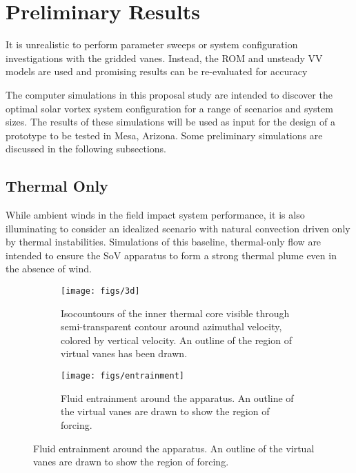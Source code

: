  
\section{Preliminary Results}
\label{sec:results}

%
%
%
%

It is unrealistic to perform parameter sweeps or system configuration investigations
with the gridded vanes. Instead, the ROM and unsteady VV models are used and promising results can be re-evaluated for 
accuracy 


The computer simulations in this proposal study 
are intended to discover the
optimal solar vortex system configuration for a range of scenarios and system
sizes. The results of these simulations will be used as input for the
design of a prototype to be tested in Mesa, Arizona. Some preliminary simulations 
are discussed in the following subsections.


\subsection{Thermal Only}

While ambient winds in the field impact system performance, it is
also illuminating to consider an idealized scenario with natural convection
driven only by thermal instabilities. Simulations of this baseline,
thermal-only flow are intended to ensure the SoV apparatus to form a
strong thermal plume even in the absence of wind. 

\begin{figure}[htb]

 \begin{subfigure}{.55\textwidth}
  \centering
  \texttt{[image: figs/3d]}
  \caption{Isocountours of the inner thermal core
  visible through semi-transparent contour around azimuthal velocity,
  colored by vertical velocity. An outline of the region of virtual
  vanes has been drawn.}
  \label{fig:thermal}  
 \end{subfigure}%
 \begin{subfigure}{.4\textwidth}
  \centering
  \texttt{[image: figs/entrainment]}%
  \caption{Fluid entrainment around the apparatus. An outline of the
  virtual vanes are drawn to show the region of forcing.} 
  \label{fig:entrain}  
 \end{subfigure}%
\end{figure}

